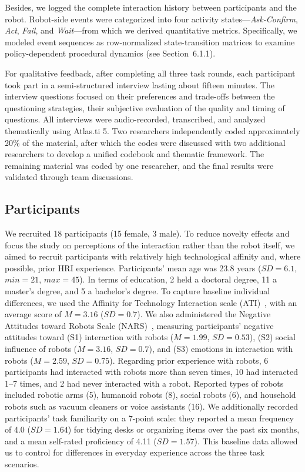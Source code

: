 \documentclass[sigconf,authordraft]{acmart}
\begin{document}
Besides, we logged the complete interaction history between participants and the robot. Robot-side events were categorized into four activity states—\textit{Ask-Confirm}, \textit{Act}, \textit{Fail}, and \textit{Wait}—from which we derived quantitative metrics. Specifically, we modeled event sequences as row-normalized state-transition matrices to examine policy-dependent procedural dynamics (see Section~6.1.1).

For qualitative feedback, after completing all three task rounds, each participant took part in a semi-structured interview lasting about fifteen minutes. The interview questions focused on their preferences and trade-offs between the questioning strategies, their subjective evaluation of the quality and timing of questions. All interviews were audio-recorded, transcribed, and analyzed thematically using Atlas.ti 5. Two researchers independently coded approximately 20\% of the material, after which the codes were discussed with two additional researchers to develop a unified codebook and thematic framework. The remaining material was coded by one researcher, and the final results were validated through team discussions.


\subsection{Participants}
We recruited 18 participants (15 female, 3 male). To reduce novelty effects and focus the study on perceptions of the interaction rather than the robot itself, we aimed to recruit participants with relatively high technological affinity and, where possible, prior HRI experience. Participants’ mean age was 23.8 years ($SD = 6.1$, $min = 21$, $max = 45$). In terms of education, 2 held a doctoral degree, 11 a master’s degree, and 5 a bachelor’s degree. To capture baseline individual differences, we used the Affinity for Technology Interaction scale (ATI)~\cite{franke2019personal}, with an average score of $M = 3.16$ ($SD = 0.7$). We also administered the Negative Attitudes toward Robots Scale (NARS)~\cite{syrdal2009negative}, measuring participants’ negative attitudes toward (S1) interaction with robots ($M = 1.99$, $SD = 0.53$), (S2) social influence of robots ($M = 3.16$, $SD = 0.7$), and (S3) emotions in interaction with robots ($M = 2.59$, $SD = 0.75$).  Regarding prior experience with robots, 6 participants had interacted with robots more than seven times, 10 had interacted 1–7 times, and 2 had never interacted with a robot. Reported types of robots included robotic arms (5), humanoid robots (8), social robots (6), and household robots such as vacuum cleaners or voice assistants (16).  We additionally recorded participants’ task familiarity on a 7-point scale: they reported a mean frequency of 4.0 ($SD = 1.64$) for tidying desks or organizing items over the past six months, and a mean self-rated proficiency of 4.11 ($SD = 1.57$). This baseline data allowed us to control for differences in everyday experience across the three task scenarios.  
\end{document}
